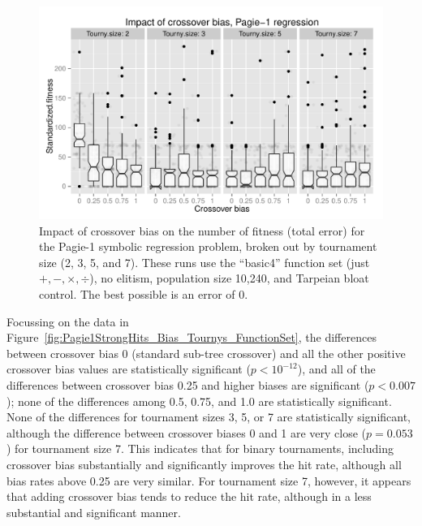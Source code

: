 \documentclass{sig-alternate}
\begin{document}
\begin{figure}
\centering
\includegraphics[width=0.45 \textwidth]{Plots/Pagie_1_strong_Fitness_vs_Bias_Tournys_FunctionSet.pdf}
\caption{Impact of crossover bias on the number of fitness (total error) for the Pagie-1 symbolic regression problem, 
broken out by tournament size (2, 3, 5, and 7). These runs use the ``basic4'' function set (just $+, -, \times, \div$), no 
elitism, population size 10,240, and Tarpeian bloat control. The best possible is an error of 0.}
\label{fig:Pagie1StrongFitness_Bias_Tournys_FunctionSet}
\end{figure}

Focussing on the data in Figure~\ref{fig:Pagie1StrongHits_Bias_Tournys_FunctionSet}, the differences between 
crossover bias 0 (standard sub-tree crossover) and all the other positive crossover bias values are statistically 
significant ($p<10^{-12}$), and all of the differences between crossover bias 0.25 and higher biases are significant 
($p<0.007$); none of the differences among 0.5, 0.75, and 1.0 are statistically significant. None of the differences for 
tournament sizes 3, 5, or 7 are statistically significant, although the difference between crossover biases 0 and 1 are 
very close ($p=0.053$) for tournament size 7. This indicates that for binary tournaments, including crossover bias 
substantially and significantly improves the hit rate, although all bias rates above 0.25 are very similar. For tournament 
size 7, however, it appears that adding crossover bias tends to reduce the hit rate, although in a less substantial and 
significant manner.

%
%
%
%
\end{document}

